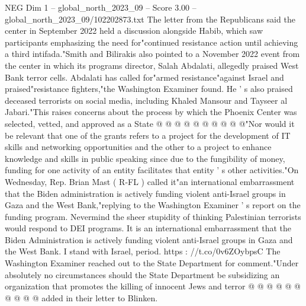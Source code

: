 \begin{textsample}{NEG Dim 1 – global\_north\_2023\_09 – Score 3.00 – global\_north\_2023\_09/102202873.txt}
The letter from the Republicans said the center in September 2022 held a discussion alongside Habib, which saw participants emphasizing the need for"continued resistance action until achieving a third intifada."Smith and Bilirakis also pointed to a November 2022 event from the center in which its programs director, Salah Abdalati, allegedly praised West Bank terror cells.
Abdalati has called for"armed resistance"against Israel and praised"resistance fighters,"the Washington Examiner found.
He ' s also praised deceased terrorists on social media, including Khaled Mansour and Tayseer al Jabari."This raises concerns about the process by which the Phoenix Center was selected, vetted, and approved as a State @ @ @ @ @ @ @ @ @ @"Nor would it be relevant that one of the grants refers to a project for the development of IT skills and networking opportunities and the other to a project to enhance knowledge and skills in public speaking since due to the fungibility of money, funding for one activity of an entity facilitates that entity ' s other activities."On Wednesday, Rep.
Brian Mast ( R-FL ) called it"an international embarrassment that the Biden administration is actively funding violent anti-Israel groups in Gaza and the West Bank,"replying to the Washington Examiner ' s report on the funding program.
Nevermind the sheer stupidity of thinking Palestinian terrorists would respond to DEI programs.
It is an international embarrassment that the Biden Administration is actively funding violent anti-Israel groups in Gaza and the West Bank.
I stand with Israel, period. https : //t.co/0v6ZOybpsC The Washington Examiner reached out to the State Department for comment."Under absolutely no circumstances should the State Department be subsidizing an organization that promotes the killing of innocent Jews and terror @ @ @ @ @ @ @ @ @ @ added in their letter to Blinken.

\end{textsample}
